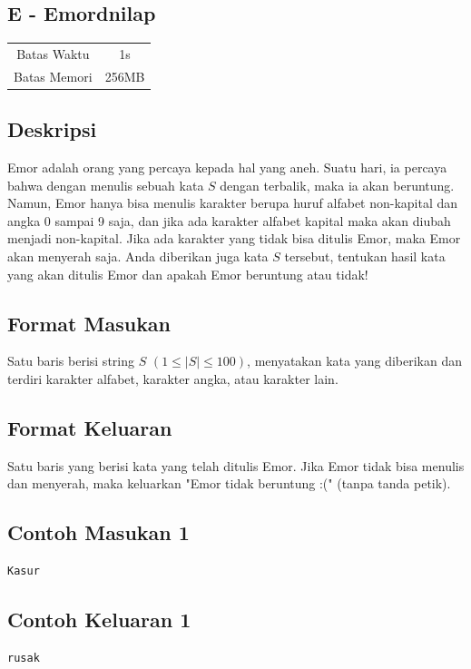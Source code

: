 \documentclass{article}
\begin{document}
\begin{center}
    \section*{E - Emordnilap} %

    \begin{tabular}{ | c c | }
        \hline
        Batas Waktu  & 1s \\    %
        Batas Memori & 256MB \\  %
        \hline
    \end{tabular}
\end{center}

\subsection*{Deskripsi}
Emor adalah orang yang percaya kepada hal yang aneh. Suatu hari, ia percaya bahwa dengan menulis sebuah kata $S$ dengan terbalik, maka ia akan beruntung. Namun, Emor hanya bisa menulis karakter berupa huruf alfabet non-kapital dan angka 0 sampai 9 saja, dan jika ada karakter alfabet kapital maka akan diubah menjadi non-kapital. Jika ada karakter yang tidak bisa ditulis Emor, maka Emor akan menyerah saja. Anda diberikan juga kata $S$ tersebut, tentukan hasil kata yang akan ditulis Emor dan apakah Emor beruntung atau tidak!

\subsection*{Format Masukan}
Satu baris berisi string $S$ $(1 \leq |S| \leq 100)$, menyatakan kata yang diberikan dan terdiri karakter alfabet, karakter angka, atau karakter lain.

\subsection*{Format Keluaran}
Satu baris yang berisi kata yang telah ditulis Emor. Jika Emor tidak bisa menulis dan menyerah, maka keluarkan "Emor tidak beruntung :(" (tanpa tanda petik).

\begin{multicols}{2}
\subsection*{Contoh Masukan 1}
\begin{lstlisting}
Kasur
\end{lstlisting}
\columnbreak
\subsection*{Contoh Keluaran 1}
\begin{lstlisting}
rusak
\end{lstlisting}
\vfill
\null
\end{multicols}
\end{document}
